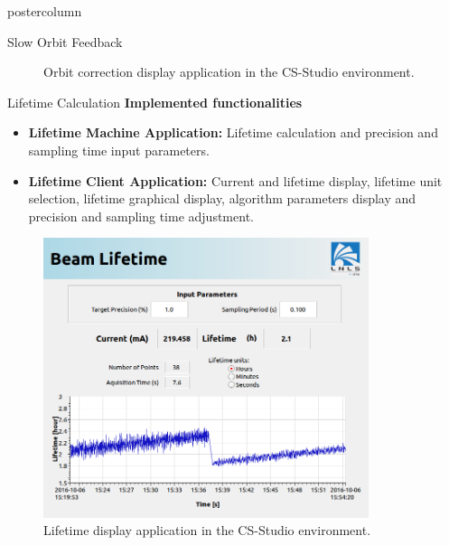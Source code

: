 \documentclass{beamer}
\begin{document}
\begin{frame}
\begin{columns}
\begin{column}{.55\textwidth}
\begin{beamercolorbox}[center]{postercolumn}
\begin{minipage}{.98\textwidth}
{\begin{myblock}{Slow Orbit Feedback}
\begin{figure}
							\caption{Orbit correction display application in the CS-Studio environment.}
						\end{figure}
					\end{myblock}\vfill
					\begin{myblock}{Lifetime Calculation}
						\textbf{Implemented functionalities}
						\begin{itemize}
							\item \textbf{Lifetime Machine Application:} Lifetime calculation and precision and sampling time input parameters.
							\item \textbf{Lifetime Client Application:} Current and lifetime display, lifetime unit selection, lifetime graphical display, algorithm parameters display and precision and sampling time adjustment.
						\end{itemize}
						\vspace{0.5cm}
						\begin{figure}
							\centering
							\includegraphics[width=0.85\textwidth]{../WEPOPRPO22f2.png}
							\caption{Lifetime display application in the CS-Studio environment.}
						\end{figure}
					\end{myblock}\vfill
		}\end{minipage}\end{beamercolorbox}
	\end{column}
\end{columns}
\end{frame}
\end{document}
